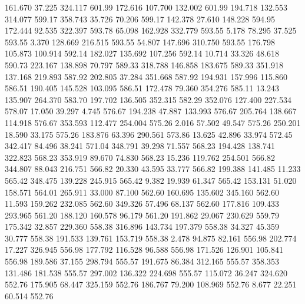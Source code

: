  161.670   37.225  324.117       601.99
 172.616  107.700  132.002       601.99
 194.718  132.553  314.077       599.17
 358.743   35.726   70.206       599.17
 142.378   27.610  148.228       594.95
 172.444   92.535  322.397       593.78
  65.098  162.928  332.779       593.55
   5.178   78.295   37.525       593.55
   3.370  128.669  216.515       593.55
  54.807  147.696  310.750       593.55
 176.798  105.873  100.914       592.14
 182.027  135.692  107.256       592.14
  10.714   33.326   48.618       590.73
 223.167  138.898   70.797       589.33
 318.788  146.858  183.675       589.33
 351.918  137.168  219.893       587.92
 202.805   37.284  351.668       587.92
 194.931  157.996  115.860       586.51
 190.405  145.528  103.095       586.51
 172.478   79.360  354.276       585.11
  13.243  135.907  264.370       583.70
 197.702  136.505  352.315       582.29
 352.076  127.400  227.534       578.07
  17.050   39.297    4.745       576.67
 194.238   47.887  133.993       576.67
 205.764  138.667  114.918       576.67
 353.593  112.477  254.004       575.26
   2.016   57.502   49.547       575.26
 250.201   18.590   33.175       575.26
 183.876   63.396  290.561       573.86
  13.625   42.896   33.974       572.45
 342.417   84.496   38.241       571.04
 348.791   39.298   71.557       568.23
 194.428  138.741  322.823       568.23
 353.919   89.670   74.830       568.23
  15.236  119.762  254.501       566.82
 344.807   88.043  216.751       566.82
  20.330   43.595   33.777       566.82
 199.388  141.485   11.233       565.42
 348.475  139.228  245.915       565.42
   9.382   19.939   61.347       565.42
 153.131   51.020  158.571       564.01
 265.911   33.000   87.100       562.60
 160.695  135.602  345.160       562.60
  11.593  159.262  232.085       562.60
 349.326   57.496   68.137       562.60
 177.816  109.433  293.965       561.20
 188.120  160.578   96.179       561.20
 191.862   29.067  230.629       559.79
 175.342   32.857  229.360       558.38
 316.896  143.734  197.379       558.38
  34.327   45.359   30.777       558.38
 191.533  139.761  153.719       558.38
   2.478   94.875   82.161       556.98
 202.774   17.227  326.945       556.98
 177.792  116.528   96.588       556.98
 171.526  126.901  105.841       556.98
 189.586   37.155  298.794       555.57
 191.675   86.384  312.165       555.57
 358.353  131.486  181.538       555.57
 297.002  136.322  224.698       555.57
 115.072   36.247  324.620       552.76
 175.905   68.447  325.159       552.76
 186.767   79.200  108.969       552.76
   8.677   22.251   60.514       552.76
